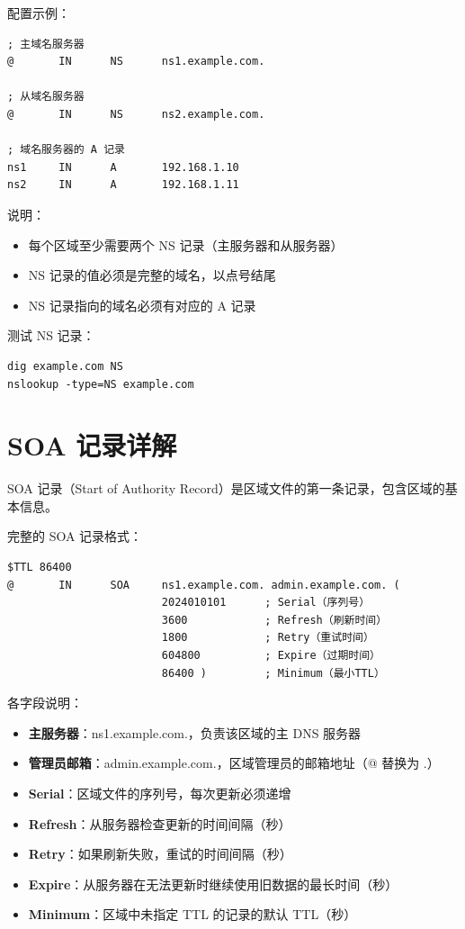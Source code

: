 \documentclass[12pt,UTF8]{ctexbook}
\begin{document}
配置示例：
\begin{verbatim}
; 主域名服务器
@       IN      NS      ns1.example.com.

; 从域名服务器
@       IN      NS      ns2.example.com.

; 域名服务器的 A 记录
ns1     IN      A       192.168.1.10
ns2     IN      A       192.168.1.11
\end{verbatim}

说明：
\begin{itemize}
    \item 每个区域至少需要两个 NS 记录（主服务器和从服务器）
    \item NS 记录的值必须是完整的域名，以点号结尾
    \item NS 记录指向的域名必须有对应的 A 记录
\end{itemize}

测试 NS 记录：
\begin{verbatim}
dig example.com NS
nslookup -type=NS example.com
\end{verbatim}

\section{SOA 记录详解}
\label{sec:soa_record_details}

SOA 记录（Start of Authority Record）是区域文件的第一条记录，包含区域的基本信息。

完整的 SOA 记录格式：
\begin{verbatim}
$TTL 86400
@       IN      SOA     ns1.example.com. admin.example.com. (
                        2024010101      ; Serial（序列号）
                        3600            ; Refresh（刷新时间）
                        1800            ; Retry（重试时间）
                        604800          ; Expire（过期时间）
                        86400 )         ; Minimum（最小TTL）
\end{verbatim}

各字段说明：
\begin{itemize}
    \item \textbf{主服务器}：ns1.example.com.，负责该区域的主 DNS 服务器
    \item \textbf{管理员邮箱}：admin.example.com.，区域管理员的邮箱地址（@ 替换为 .）
    \item \textbf{Serial}：区域文件的序列号，每次更新必须递增
    \item \textbf{Refresh}：从服务器检查更新的时间间隔（秒）
    \item \textbf{Retry}：如果刷新失败，重试的时间间隔（秒）
    \item \textbf{Expire}：从服务器在无法更新时继续使用旧数据的最长时间（秒）
    \item \textbf{Minimum}：区域中未指定 TTL 的记录的默认 TTL（秒）
\end{itemize}
\end{document}
